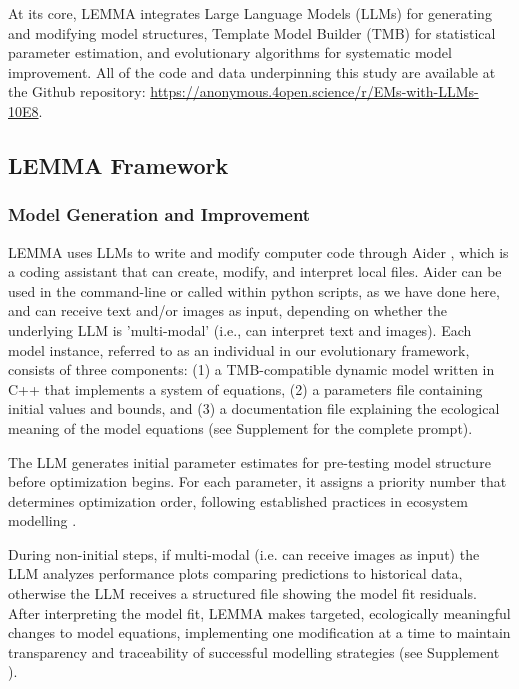 At its core, LEMMA integrates Large Language Models (LLMs) for generating and modifying model structures, Template Model Builder (TMB) for statistical parameter estimation, and evolutionary algorithms for systematic model improvement. All of the code and data underpinning this study are available at the Github repository: \url{https://anonymous.4open.science/r/EMs-with-LLMs-10E8}.

\subsection{LEMMA Framework}

\subsubsection{Model Generation and Improvement}
LEMMA uses LLMs to write and modify computer code through Aider \citep{gauthier2024aider}, which is a coding assistant that can create, modify, and interpret local files. Aider can be used in the command-line or called within python scripts, as we have done here, and can receive text and/or images as input, depending on whether the underlying LLM is 'multi-modal' (i.e., can interpret text and images). Each model instance, referred to as an individual in our evolutionary framework, consists of three components: (1) a TMB-compatible dynamic model written in C++ that implements a system of equations, (2) a parameters file containing initial values and bounds, and (3) a documentation file explaining the ecological meaning of the model equations (see Supplement %
for the complete prompt).

The LLM generates initial parameter estimates for pre-testing model structure before optimization begins. For each parameter, it assigns a priority number that determines optimization order, following established practices in ecosystem modelling \citep{Plaganyi_Punt_Hillary_Morello_Thebaud_Hutton_Pillans_Thorson_Fulton_Smith_et_al_2014}.

During non-initial steps, if multi-modal (i.e. can receive images as input) the LLM analyzes performance plots comparing predictions to historical data, otherwise the LLM receives a structured file showing the model fit residuals. After interpreting the model fit, LEMMA makes targeted, ecologically meaningful changes to model equations, implementing one modification at a time to maintain transparency and traceability of successful modelling strategies (see Supplement%
).

